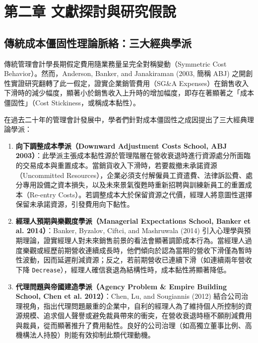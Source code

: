 \documentclass[12pt,a4paper]{article}
\begin{document}
\newpage

\section{第二章 文獻探討與研究假說}

\subsection{傳統成本僵固性理論脈絡：三大經典學派}

傳統管理會計學長期假定費用隨業務量呈完全對稱變動（Symmetric Cost Behavior）。然而，Anderson, Banker, and Janakiraman (2003, 簡稱 ABJ) 之開創性實證研究翻轉了此一假定，證實企業銷管費用（SG\&A Expenses）在銷售收入下滑時的減少幅度，顯著小於銷售收入上升時的增加幅度，即存在著顯著之「成本僵固性」（Cost Stickiness，或稱成本黏性）。

在過去二十年的管理會計發展中，學者們針對成本僵固性之成因提出了三大經典理論學派：

\begin{enumerate}[leftmargin=*]
    \item \textbf{向下調整成本學派（Downward Adjustment Costs School, ABJ 2003）}：此學派主張成本黏性源於管理階層在營收衰退時進行資源處分所面臨的交易成本與重置成本。當銷貨收入下滑時，若要裁撤未承諾資源（Uncommitted Resources），企業必須支付解僱員工資遣費、法律訴訟費、處分專用設備之資本損失，以及未來景氣復甦時重新招聘與訓練新員工的重置成本（Re-entry Costs）。若調整成本大於保留資源之代價，經理人將意圖性選擇保留未承諾資源，引發費用向下黏性。
    \item \textbf{經理人預期與樂觀度學派（Managerial Expectations School, Banker et al. 2014）}：Banker, Byzalov, Ciftci, and Mashruwala (2014) 引入心理學與預期理論，證實經理人對未來銷售前景的看法會顯著調節成本行為。當經理人過度樂觀或經歷前期營收連續成長時，他們傾向於認為當期的營收下滑僅為暫時性波動，因而延遲削減資源；反之，若前期營收已連續下滑（如連續兩年營收下降 \texttt{Decrease}），經理人確信衰退為結構性時，成本黏性將顯著降低。
    \item \textbf{代理問題與帝國建造學派（Agency Problem \& Empire Building School, Chen et al. 2012）}：Chen, Lu, and Sougiannis (2012) 結合公司治理視角，指出代理問題嚴重的企業中，自利的經理人為了維持個人所控制的資源規模、追求個人聲譽或避免裁員帶來的衝突，在營收衰退時極不願削減費用與裁員，從而顯著推升了費用黏性。良好的公司治理（如高獨立董事比例、高機構法人持股）則能有效抑制此類代理動機。
\end{enumerate}
\end{document}
